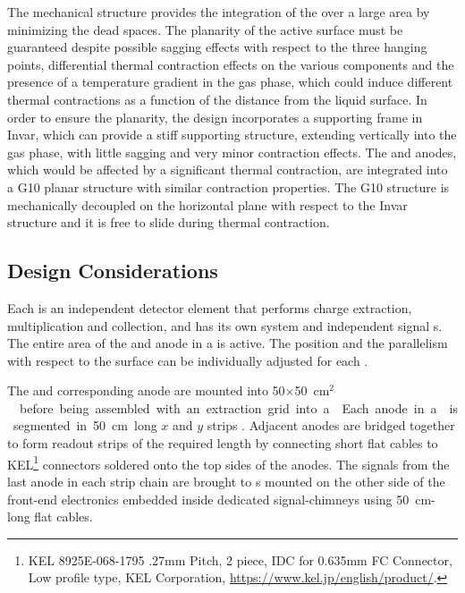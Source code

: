 The  mechanical structure provides the integration of the  over a large area by minimizing the dead spaces. The planarity of the active surface must be guaranteed despite possible sagging effects with respect to the three hanging points, differential thermal contraction effects on the various  components and the presence of a temperature gradient in the gas phase, which could induce different thermal contractions as a function of the distance from the liquid surface. In order to %
ensure the planarity, the design %
incorporates a supporting frame in Invar, which %
can provide a stiff supporting structure, extending vertically into the gas phase, with little sagging and %
very minor contraction effects. The  and anodes, which would be affected by a significant thermal contraction, are integrated into a G10 planar structure with similar contraction %
properties. The G10 structure is mechanically decoupled on the horizontal plane with respect to the Invar structure  and it is free to slide during thermal contraction. 

\subsection{Design Considerations}
\label{sec:fddp-crp-des-consid}

Each  is an independent detector element that performs charge
extraction, multiplication and collection, and has its own  system and independent signal \fdth{}s. The entire area of the  and anode in a  is active. The position and the parallelism with respect to the \lar surface can be individually adjusted for each .

The  and corresponding anode are mounted into %
\num{50}$\times$\SI{50}{cm$^2$}  %
 before being assembled with an extraction grid into a . Each anode in a  is segmented in \SI{50}{cm} long $x$ and $y$ strips . Adjacent  anodes are bridged together to form readout strips of the required length by connecting short flat cables to KEL\footnote{KEL 8925E-068-1795 .27mm Pitch, 2 piece, IDC for 0.635mm FC Connector, Low profile type, KEL Corporation\texttrademark{}, \url{https://www.kel.jp/english/product/}.} connectors soldered onto the top sides of the anodes. The signals from the last anode in each  strip chain are brought to \fdth{}s mounted on the other side of the front-end electronics embedded inside dedicated signal-\fdth chimneys using \SI{50}{cm}-long flat cables.


